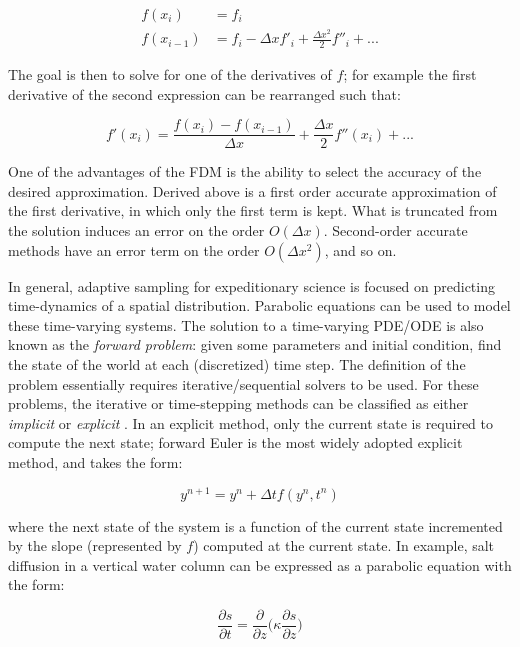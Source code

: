 \begin{align}
	f(x_i) &= f_i\\
	f(x_{i-1}) &= f_i - \Delta x f'_i + \frac{\Delta x^2}{2}f''_i + ...
\end{align}

The goal is then to solve for one of the derivatives of $f$; for example the first derivative of the second expression can be rearranged such that:

\begin{equation}
	f'(x_i) = \frac{f(x_i) - f(x_{i-1})}{\Delta x} + \frac{\Delta x}{2}f''(x_i) + ...
\end{equation}

One of the advantages of the FDM is the ability to select the accuracy of the desired approximation. Derived above is a first order accurate approximation of the first derivative, in which only the first term is kept. What is truncated from the solution induces an error on the order $O(\Delta x)$. Second-order accurate methods have an error term on the order $O(\Delta x^2)$, and so on.

In general, adaptive sampling for expeditionary science is focused on predicting time-dynamics of a spatial distribution. Parabolic equations can be used to model these time-varying systems. The solution to a time-varying PDE/ODE is also known as the \emph{forward problem}: given some parameters and initial condition, find the state of the world at each (discretized) time step. The definition of the problem essentially requires iterative/sequential solvers to be used. For these problems, the iterative or time-stepping methods can be classified as either \emph{implicit} or \emph{explicit} \autocite{biswas2013discussion,hahn1991modified}. In an explicit method, only the current state is required to compute the next state; forward Euler is the most widely adopted explicit method, and takes the form:

\begin{equation}
	y^{n+1} = y^n + \Delta t f(y^n,t^n)
\end{equation}

\noindent where the next state of the system is a function of the current state incremented by the slope (represented by $f$) computed at the current state. In example, salt diffusion in a vertical water column can be expressed as a parabolic equation with the form:

\begin{equation}
	\frac{\partial s}{\partial t} = \frac{\partial}{\partial z}\Big(\kappa \frac{\partial s}{\partial z}\Big)
	\label{eqn:salt}
\end{equation}

